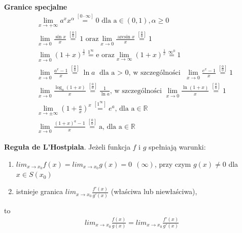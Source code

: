 \documentclass[12pt]{article}
\begin{document}
    \begin{theorem}
        \textbf{Granice specjalne}
        \setlength{\jot}{10pt}
        \begin{align*}
            &\lim_{x \to +\infty} a^{x} x^{\alpha} \stackrel{[0 \cdot \infty]}{=}  \text{0 dla a} \in (0, 1), \alpha \geq 0 \\
            &\lim_{x \to 0} \frac{\sin{x}}{x} \stackrel{[\frac{0}{0}]}{=} \text{1 oraz}    \lim_{x \to 0} \frac{\arcsin{x}}{x} \stackrel{[\frac{0}{0}]}{=} 1\\
            &\lim_{x \to 0} (1 + x)^{\frac{1}{x}} \stackrel{1^{\infty}}{=} \text{e oraz}   \lim_{x \to \infty} (1 + x)^{\frac{1}{x}} \stackrel{\infty^{0}}{=} 1 \\
            &\lim_{x \to 0} \frac{a^x -1}{x} \stackrel{[\frac{0}{0}]}{=} \ln{a} \text{ dla a $>$ 0, w szczególności } \lim_{x \to 0} \frac{e^x -1}{x} \stackrel{[\frac{0}{0}]}{=} 1 \\
            &\lim_{x \to 0} \frac{\log_{a}(1 + x)}{x} \stackrel{[\frac{0}{0}]}{=} \frac{1}{\ln{a}} \text{, w szczególności } \lim_{x \to 0} \frac{\ln(1 + x)}{x} \stackrel{[\frac{0}{0}]}{=} 1 \\
            &\lim_{x \to \pm \infty} (1 + \frac{a}{x})^{x} \stackrel{[1^{\infty}]}{=} e^{a} \text{, dla a} \in \mathbb{R} \\
            &\lim_{x \to 0} \frac{(1 + x)^a - 1}{x} \stackrel{[\frac{0}{0}]}{=} \text{a, dla a} \in \mathbb{R}
        \end{align*}
    \end{theorem}

    \begin{theorem}
        \textbf{Reguła de L'Hostpiala}. Jeżeli funkcja $f$ i  $g$ spełniają warunki:
        \begin{enumerate}
            \item $lim_{x \rightarrow x_0} f(x) = lim_{x \rightarrow x_0} g(x) = 0 ~~ (\infty)$, przy czym $g(x) \neq 0$ dla $x \in S(x_0)$
            \item istnieje granica $lim_{x \rightarrow x_0} \frac{f'(x)}{g'(x)}$ (właściwa lub niewłaściwa),
        \end{enumerate}
        to
        \begin{align*}
            lim_{x \rightarrow x_0} \frac{f(x)}{g(x)} = lim_{x \rightarrow x_0} \frac{f'(x)}{g'(x)}
        \end{align*}
    \end{theorem}

    \newpage
\end{document}
